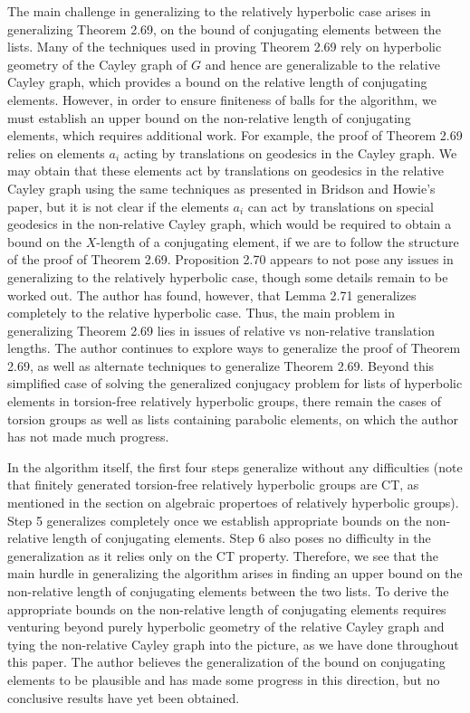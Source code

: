 \documentclass[12pt]{article}
\newcommand{\vs}{\vskip10pt}
\begin{document}
	The main challenge in generalizing to the relatively hyperbolic case arises in generalizing Theorem 2.69, on the bound of conjugating elements between the lists. Many of the techniques used in proving Theorem 2.69 rely on hyperbolic geometry of the Cayley graph of $G$ and hence are generalizable to the relative Cayley graph, which provides a bound on the relative length of conjugating elements. However, in order to ensure finiteness of balls for the algorithm, we must establish an upper bound on the non-relative length of conjugating elements, which requires additional work. For example, the proof of Theorem 2.69 relies on elements $a_i$ acting by translations on geodesics in the Cayley graph. We may obtain that these elements act by translations on geodesics in the relative Cayley graph using the same techniques as presented in Bridson and Howie's paper, but it is not clear if the elements $a_i$ can act by translations on special geodesics in the non-relative Cayley graph, which would be required to obtain a bound on the $X$-length of a conjugating element, if we are to follow the structure of the proof of Theorem 2.69. Proposition 2.70 appears to not pose any issues in generalizing to the relatively hyperbolic case, though some details remain to be worked out. The author has found, however, that Lemma 2.71 generalizes completely to the relative hyperbolic case. Thus, the main problem in generalizing Theorem 2.69 lies in issues of relative vs non-relative translation lengths. The author continues to explore ways to generalize the proof of Theorem 2.69, as well as alternate techniques to generalize Theorem 2.69. Beyond this simplified case of solving the generalized conjugacy problem for lists of hyperbolic elements in torsion-free relatively hyperbolic groups, there remain the cases of torsion groups as well as lists containing parabolic elements, on which the author has not made much progress. 
	
	\vs 
	
	In the algorithm itself, the first four steps generalize without any difficulties (note that finitely generated torsion-free relatively hyperbolic groups are CT, as mentioned in the section on algebraic propertoes of relatively hyperbolic groups). Step 5 generalizes completely once we establish appropriate bounds on the non-relative length of conjugating elements. Step 6 also poses no difficulty in the generalization as it relies only on the CT property. Therefore, we see that the main hurdle in generalizing the algorithm arises in finding an upper bound on the non-relative length of conjugating elements between the two lists. To derive the appropriate bounds on the non-relative length of conjugating elements requires venturing beyond purely hyperbolic geometry of the relative Cayley graph and tying the non-relative Cayley graph into the picture, as we have done throughout this paper. The author believes the generalization of the bound on conjugating elements to be plausible and has made some progress in this direction, but no conclusive results have yet been obtained. 
	
\end{document}
